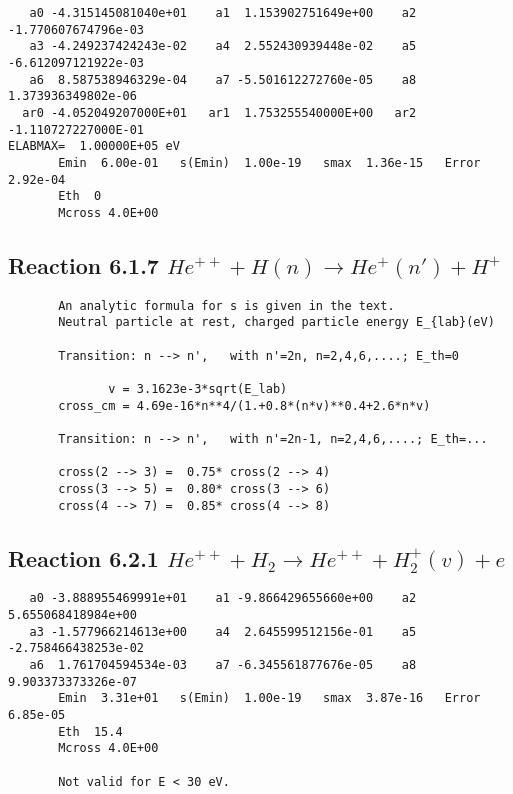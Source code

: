 \documentclass[12pt,dvipdfm]{article}
\begin{document}
\begin{small}\begin{verbatim}
   a0 -4.315145081040e+01    a1  1.153902751649e+00    a2 -1.770607674796e-03
   a3 -4.249237424243e-02    a4  2.552430939448e-02    a5 -6.612097121922e-03
   a6  8.587538946329e-04    a7 -5.501612272760e-05    a8  1.373936349802e-06
  ar0 -4.052049207000E+01   ar1  1.753255540000E+00   ar2 -1.110727227000E-01
ELABMAX=  1.00000E+05 eV
       Emin  6.00e-01   s(Emin)  1.00e-19   smax  1.36e-15   Error  2.92e-04
       Eth  0
       Mcross 4.0E+00
\end{verbatim}\end{small}

\newpage
\subsection{
Reaction 6.1.7 $   He^{++} + H(n) \rightarrow  He^+(n') + H^+$}

\begin{small}\begin{verbatim}
       An analytic formula for s is given in the text.
       Neutral particle at rest, charged particle energy E_{lab}(eV)

       Transition: n --> n',   with n'=2n, n=2,4,6,....; E_th=0

              v = 3.1623e-3*sqrt(E_lab)
       cross_cm = 4.69e-16*n**4/(1.+0.8*(n*v)**0.4+2.6*n*v)

       Transition: n --> n',   with n'=2n-1, n=2,4,6,....; E_th=...

       cross(2 --> 3) =  0.75* cross(2 --> 4)
       cross(3 --> 5) =  0.80* cross(3 --> 6)
       cross(4 --> 7) =  0.85* cross(4 --> 8)
\end{verbatim}\end{small}

\newpage
\subsection{
Reaction 6.2.1 $   He^{++} + H_2 \rightarrow He^{++} + H_2^+(v) + e$}


\begin{small}\begin{verbatim}
   a0 -3.888955469991e+01    a1 -9.866429655660e+00    a2  5.655068418984e+00
   a3 -1.577966214613e+00    a4  2.645599512156e-01    a5 -2.758466438253e-02
   a6  1.761704594534e-03    a7 -6.345561877676e-05    a8  9.903373373326e-07
       Emin  3.31e+01   s(Emin)  1.00e-19   smax  3.87e-16   Error  6.85e-05
       Eth  15.4
       Mcross 4.0E+00

       Not valid for E < 30 eV.
\end{verbatim}\end{small}
\end{document}
